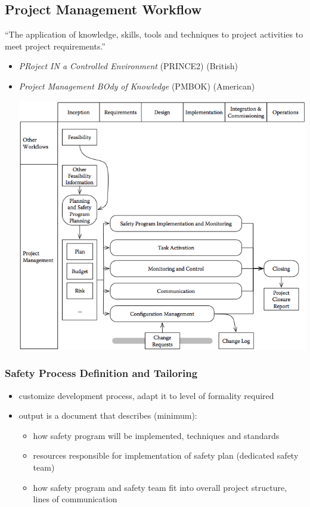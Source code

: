 \documentclass[a4paper, 10pt]{article}
\begin{document}
\subsection*{Project Management Workflow}
\begin{shaded}
    ``The application of knowledge, skills, tools and techniques to project activities to meet project requirements.''
\end{shaded}
\begin{itemize}
    \item \emph{PRoject IN a Controlled Environment} (PRINCE2) (British)
    \item \emph{Project Management BOdy of Knowledge} (PMBOK) (American)
    \begin{center}
    \includegraphics[width=\linewidth]{images/management.png}
    \end{center}
\end{itemize}

\subsubsection*{Safety Process Definition and Tailoring}
\begin{itemize}
    \item customize development process, adapt it to level of formality required
    \item output is a document that describes (minimum):
    \begin{itemize}
        \item how safety program will be implemented, techniques and standards
        \item resources responsible for implementation of safety plan (\follows dedicated safety team)
        \item how safety program and safety team fit into overall project structure, lines of communication
    \end{itemize}
\end{itemize}
\end{document}
